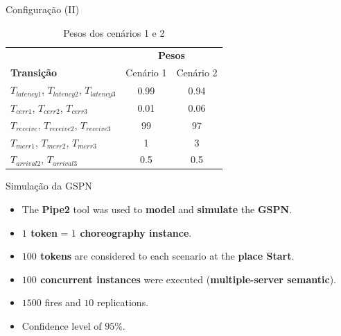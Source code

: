 \documentclass[xcolor=svgnames]{beamer}
\newcommand {\otoprule}{\midrule [\heavyrulewidth]}  %
\begin{document}
  \begin{frame}{ Configuração (II) }
        \begin{table}[!h]
            \centering
            \caption{Pesos dos cenários 1 e 2}
            \label{table:transitionsConfigurations}
            \begin{tabular}{ lcc}
	      \toprule	
        		    &   \multicolumn{2}{c}{ \textbf{Pesos} } \\
	      \cmidrule(r){2-3}
              \textbf{Transição}      		&      Cenário 1   &   Cenário 2 		\\
	      \otoprule
               $T_{latency1}$, $T_{latency2}$, $T_{latency3}$ 	& 	0.99       &   0.94	\\
               $T_{cerr1}$, $T_{cerr2}$, $T_{cerr3}$      	&  	0.01 	   &   0.06	\\
               $T_{receive}$, $T_{receive2}$, $T_{receive3}$  &  	99  	   &    97	\\
               $T_{merr1}$, $T_{merr2}$, $T_{merr3}$   &   1 	   &    3	\\
               $T_{arrival2}$, $T_{arrival3}$   &  0.5  &	0.5	\\
              \bottomrule
            \end{tabular}
        \end{table}

  \end{frame}


    \begin{frame}{ Simulação da GSPN }
      \begin{itemize}
	\item <1-> The \textbf{Pipe2} tool was used to \textbf{model} and \textbf{simulate} the \textbf{GSPN}.
	\item <2-> \textbf{$1$ token} = \textbf{$1$ choreography instance}.
	\item <2-> \textbf{$100$ tokens} are considered to each scenario at the \textbf{place Start}.
	\item <2-> \textbf{$100$ concurrent instances} were executed (\textbf{multiple-server semantic}).
	\item <3-> $1500$ fires and $10$ replications.
	\item <3-> Confidence level of $95\%$.
      \end{itemize}
    \end{frame}
\end{document}
